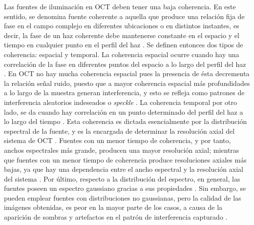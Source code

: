 Las fuentes de iluminación en OCT deben tener una baja coherencia. En este sentido, se denomina fuente coherente a aquella que produce una relación fija de fase en el campo complejo en diferentes ubicaciones o en distintos instantes, es decir, la fase de un haz coherente debe mantenerse constante en el espacio y el tiempo en cualquier punto en el perfil del haz \cite{Born1983}. Se definen entonces dos tipos de coherencia: espacial y temporal. La coherencia espacial ocurre cuando hay una correlación de la fase en diferentes puntos del espacio a lo largo del perfil del haz \cite{Hecht2000}. En OCT no hay mucha coherencia espacial pues la presencia de ésta decrementa la relación señal ruido, puesto que a mayor coherencia espacial más profundidades a lo largo de la muestra generan interferencia, y esto se refleja como patrones de interferencia aleatorios indeseados o \textit{speckle} \cite{Drexler2015}. La coherencia temporal por otro lado, se da cuando hay correlación en un punto determinado del perfil del haz a lo largo del tiempo \cite{Hecht2000}. Esta coherencia es dictada esencialmente por la distribución espectral de la fuente, y es la encargada de determinar la resolución axial del sistema de OCT \cite{Brezinski2005}. Fuentes con un menor tiempo de coherencia, y por tanto, anchos espectrales más grande, producen una mayor resolución axial; mientras que fuentes con un menor tiempo de coherencia produce resoluciones axiales más bajas, ya que hay una dependencia entre el ancho espectral y la resolución axial del sistema \cite{Brezinski2005}. Por último, respecto a la distribución del espectro, en general, las fuentes poseen un espectro gaussiano gracias a sus propiedades \cite{Brezinski2005}. Sin embargo, se pueden emplear fuentes con distribuciones no gaussianas, pero la calidad de las imágenes obtenidas, es peor en la mayor parte de los casos, a causa de la aparición de sombras y artefactos en el patrón de interferencia capturado \cite{Jansz2012}. 

